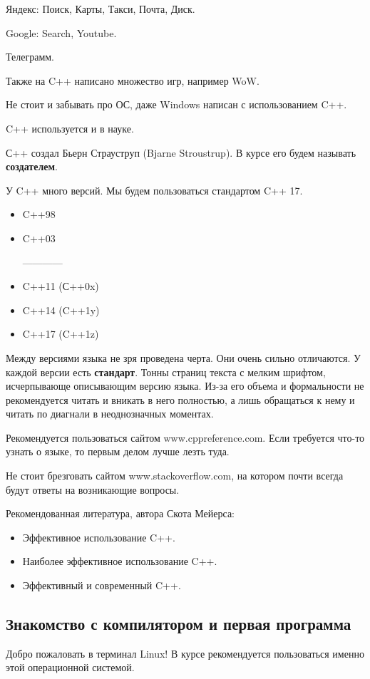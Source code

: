 \documentclass{article}
\begin{document}
Яндекс: Поиск, Карты, Такси, Почта, Диск.

Google: Search, Youtube.

Телеграмм.

Также на C++ написано множество игр, например WoW.

Не стоит и забывать про ОС, даже Windows написан с использованием C++.

C++ используется и в науке.


С++ создал Бьерн Страуструп (Bjarne Stroustrup).
В курсе его будем называть \textbf{создателем}.

У C++ много версий. Мы будем пользоваться стандартом C++ 17.

\begin{itemize}
    \item C++98
    \item C++03

    ------------

    \item C++11 (С++0x)
    \item C++14 (C++1y)
    \item C++17 (C++1z)
\end{itemize}

Между версиями языка не зря проведена черта. Они очень сильно отличаются.
У каждой версии есть \textbf{стандарт}. Тонны страниц текста с мелким шрифтом, исчерпывающе описывающим версию языка.
Из-за его объема и формальности не рекомендуется читать и вникать в него полностью, а лишь обращаться к нему и читать по диагнали в неоднозначных моментах.

Рекомендуется пользоваться сайтом www.cppreference.com.
Если требуется что-то узнать о языке, то первым делом лучше лезть туда.

Не стоит брезговать сайтом www.stackoverflow.com, на котором почти всегда будут ответы на возникающие вопросы.

Рекомендованная литература, автора Скота Мейерса:
\begin{itemize}
    \item Эффективное использование C++.
    \item Наиболее эффективное использование C++.
    \item Эффективный и современный C++.
\end{itemize}

\subsection{Знакомство с компилятором и первая программа}
Добро пожаловать в терминал Linux!
В курсе рекомендуется пользоваться именно этой операционной системой.
\end{document}
